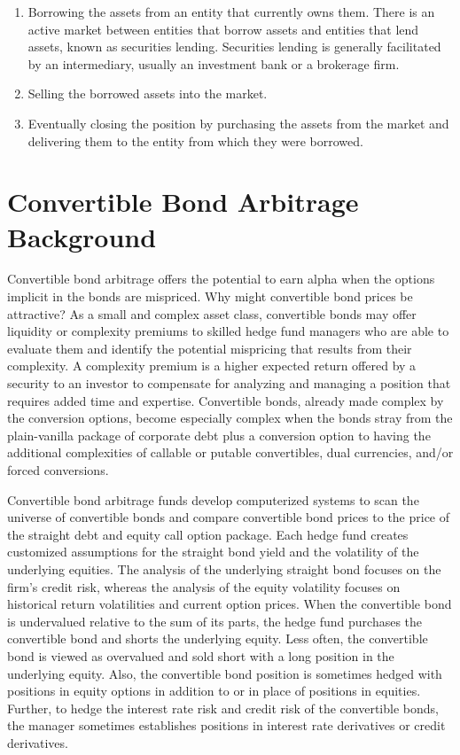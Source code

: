 \documentclass[11pt]{article}
\begin{document}
\begin{enumerate}
  \item Borrowing the assets from an entity that currently owns them. There is an active market between entities that borrow assets and entities that lend assets, known as securities lending. Securities lending is generally facilitated by an intermediary, usually an investment bank or a brokerage firm.

  \item Selling the borrowed assets into the market.

  \item Eventually closing the position by purchasing the assets from the market and delivering them to the entity from which they were borrowed.

\end{enumerate}

\section*{Convertible Bond Arbitrage Background}
Convertible bond arbitrage offers the potential to earn alpha when the options implicit in the bonds are mispriced. Why might convertible bond prices be attractive? As a small and complex asset class, convertible bonds may offer liquidity or complexity premiums to skilled hedge fund managers who are able to evaluate them and identify the potential mispricing that results from their complexity. A complexity premium is a higher expected return offered by a security to an investor to compensate for analyzing and managing a position that requires added time and expertise. Convertible bonds, already made complex by the conversion options, become especially complex when the bonds stray from the plain-vanilla package of corporate debt plus a conversion option to having the additional complexities of callable or putable convertibles, dual currencies, and/or forced conversions.

Convertible bond arbitrage funds develop computerized systems to scan the universe of convertible bonds and compare convertible bond prices to the price of the straight debt and equity call option package. Each hedge fund creates customized assumptions for the straight bond yield and the volatility of the underlying equities. The analysis of the underlying straight bond focuses on the firm's credit risk, whereas the analysis of the equity volatility focuses on historical return volatilities and current option prices. When the convertible bond is undervalued relative to the sum of its parts, the hedge fund purchases the convertible bond and shorts the underlying equity. Less often, the convertible bond is viewed as overvalued and sold short with a long position in the underlying equity. Also, the convertible bond position is sometimes hedged with positions in equity options in addition to or in place of positions in equities. Further, to hedge the interest rate risk and credit risk of the convertible bonds, the manager sometimes establishes positions in interest rate derivatives or credit derivatives.
\end{document}
